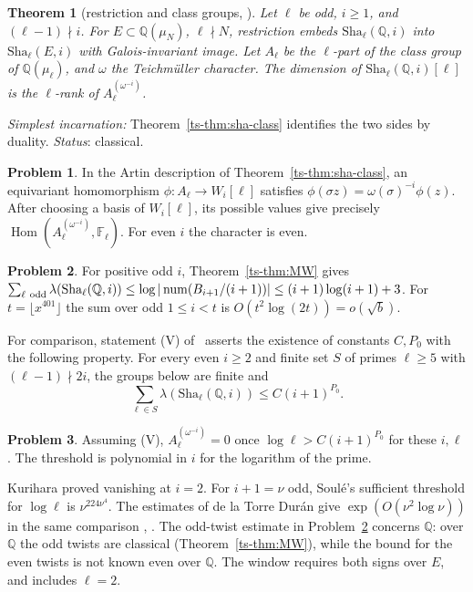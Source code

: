 \documentclass[reqno]{amsart}
\theoremstyle{definition}
\newtheorem{problem}{Problem}[section]
\theoremstyle{plain}
\newtheorem{theorem}{Theorem}[section]
\newcommand{\Q}{\mathbb Q}
\newcommand{\F}{\mathbb F}
\newcommand{\Sha}{\mathrm{Sha}}
\newcommand{\num}{\operatorname{num}}
\begin{document}
\begin{theorem}[restriction and class groups, {\cite[Props.~17.7--17.8]{Adr}}]\label{thm:class}
Let \(\ell\) be odd, \(i\ge1\), and \((\ell-1)\nmid i\).  For \(E\subset\Q(\mu_N)\), \(\ell\nmid N\), restriction embeds \(\Sha_\ell(\Q,i)\) into \(\Sha_\ell(E,i)\) with Galois-invariant image.  Let \(A_\ell\) be the \(\ell\)-part of the class group of \(\Q(\mu_\ell)\), and \(\omega\) the Teichm\"uller character.  The dimension of \(\Sha_\ell(\Q,i)[\ell]\) is the \(\ell\)-rank of \(A_\ell^{(\omega^{-i})}\).
\end{theorem}
\noindent\emph{Simplest incarnation:}  Theorem~\ref{ts-thm:sha-class} identifies the two sides by duality. \emph{Status}: classical.

\begin{problem}\label{pr:character}
In the Artin description of Theorem~\ref{ts-thm:sha-class}, an equivariant homomorphism \(\phi:A_\ell\to W_i[\ell]\) satisfies \(\phi(\sigma z)=\omega(\sigma)^{-i}\phi(z)\).  After choosing a basis of \(W_i[\ell]\), its possible values give precisely \(\operatorname{Hom}(A_\ell^{(\omega^{-i})},\F_\ell)\).  For even \(i\) the character is even.
\end{problem}

\begin{problem}\label{pr:odd}
For positive odd \(i\), Theorem~\ref{ts-thm:MW} gives
\(\sum_{\ell\ {\rm odd}}\lambda(\Sha_\ell(\Q,i))\le\log|\num(B_{i+1}/(i+1))|\le(i+1)\log(i+1)+3\).
For \(t=\lfloor x^{401}\rfloor\) the sum over odd \(1\le i<t\) is \(O(t^2\log(2t))=o(\sqrt b)\).
\end{problem}

For comparison, statement (V) of~\cite[\S17.4]{Adr} asserts the existence of constants \(C,P_0\) with the following property.  For every even \(i\ge2\) and finite set \(S\) of primes \(\ell\ge5\) with \((\ell-1)\nmid2i\), the groups below are finite and
\[
 \sum_{\ell\in S}\lambda(\Sha_\ell(\Q,i))\le C(i+1)^{P_0}.
\]

\begin{problem}\label{pr:vanishing}
Assuming (V), \(A_\ell^{(\omega^{-i})}=0\) once \(\log\ell>C(i+1)^{P_0}\) for these \(i,\ell\) \cite[Cor.~17.15]{Adr}.  The threshold is polynomial in \(i\) for the logarithm of the prime.
\end{problem}

Kurihara proved vanishing at \(i=2\).  For \(i+1=\nu\) odd, Soul\'e's sufficient threshold for \(\log\ell\) is \(\nu^{224\nu^4}\).  The estimates of de la Torre Dur\'an give \(\exp(O(\nu^2\log\nu))\) in the same comparison \cite[\S17.4, Rem.~17.16]{Adr}, \cite{Kur,So2,DT}.  The odd-twist estimate in Problem~\ref{pr:odd} concerns \(\Q\): over \(\Q\) the odd twists are classical (Theorem~\ref{ts-thm:MW}), while the bound for the even twists is not known even over \(\Q\).  The window requires both signs over \(E\), and includes \(\ell=2\).
\end{document}
